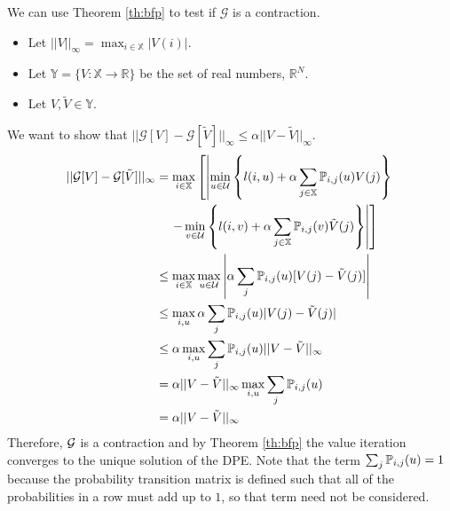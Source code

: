 We can use Theorem \ref{th:bfp} to test if $\mathcal{G}$ is a contraction.
\begin{itemize}
\item Let $||V||_\infty = \max_{i\in\mathbb{X}}|V(i)|$.
\item Let $\mathbb{Y}=\{V:\mathbb{X}\to\mathbb{R}\}$ be the set of real numbers, $\mathbb{R}^N$.
\item Let $V,\tilde{V}\in\mathbb{Y}$.
\end{itemize}
We want to show that $||\mathcal{G}[V]-\mathcal{G}[\tilde{V}]||_\infty\leq\alpha||V-\tilde{V}||_\infty$.
\begin{align*}
||\mathcal{G}[V]-\mathcal{G}[\tilde{V}]||_\infty &= \max_{i\in\mathbb{X}}\left[\left|\min_{u\in\mathcal{U}}\left\lbrace l(i,u)+\alpha\sum_{j\in\mathbb{X}}\mathbb{P}_{i,j}(u)V(j)\right\rbrace \right.\right. \\
&\left.\left.\quad - \min_{v\in\mathcal{U}}\left\lbrace l(i,v)+\alpha\sum_{j\in\mathbb{X}}\mathbb{P}_{i,j}(v)\tilde{V}(j)\right\rbrace \right|\right] \\
&\leq \max_{i\in\mathbb{X}}\max_{u\in\mathcal{U}}\left|\alpha\sum_j\mathbb{P}_{i,j}(u)[V(j)-\tilde{V}(j)]\right| \\
&\leq \max_{i,u}\alpha\sum_j\mathbb{P}_{i,j}(u)|V(j)-\tilde{V}(j)| \\
&\leq \alpha\max_{i,u}\sum_j\mathbb{P}_{i,j}(u)||V-\tilde{V}||_\infty \\
&= \alpha||V-\tilde{V}||_\infty\max_{i,u}\sum_j\mathbb{P}_{i,j}(u) \\
&= \alpha||V-\tilde{V}||_\infty
\end{align*}
Therefore, $\mathcal{G}$ is a contraction and by Theorem \ref{th:bfp} the value iteration converges to the unique solution of the DPE. Note that the term $\sum_j\mathbb{P}_{i,j}(u)=1$ because the probability transition matrix is defined such that all of the probabilities in a row must add up to $1$, so that term need not be considered.

